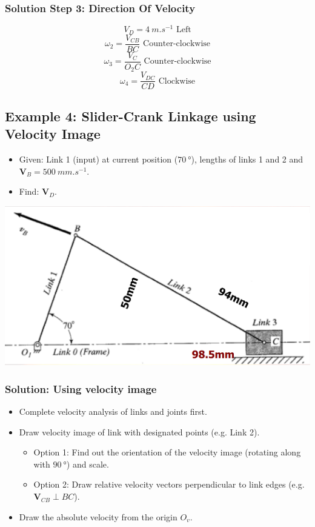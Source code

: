 \documentclass[11pt]{article}
\begin{document}
\subsubsection{Solution Step 3: Direction Of Velocity}
\label{sec:org873d2c0}
\[V_D = \qty{4}{m.s^{-1}} \text{ Left}\]
\[\omega_2 = \frac{V_{CB}}{BC} \text{ Counter-clockwise}\]
\[\omega_3 = \frac{V_{C}}{O_2 C} \text{ Counter-clockwise}\]
\[\omega_4 = \frac{V_{DC}}{CD} \text{ Clockwise}\]

 \newpage
\subsection{Example 4: Slider-Crank Linkage using Velocity Image}
\label{sec:org9549cb6}
\begin{itemize}
\item Given: Link 1 (input) at current position (\(\qty{70}{\degree}\)), lengths of links 1 and 2 and \(\boldsymbol{V}_B = \qty{500}{mm.s^{-1}}\).
\item Find: \(\boldsymbol{V}_D\).
\end{itemize}

\begin{center}
\includegraphics[width=.9\linewidth]{./images/slider-crank-linkage-graphical-analysis-example.png}
\end{center}
\subsubsection{Solution: Using velocity image}
\label{sec:org914c83a}
\begin{itemize}
\item Complete velocity analysis of links and joints first.
\item Draw velocity image of link with designated points (e.g. Link 2).
\begin{itemize}
\item Option 1: Find out the orientation of the velocity image (rotating along with \(\qty{90}{\degree}\)) and scale.
\item Option 2: Draw relative velocity vectors perpendicular to link edges (e.g. \(\boldsymbol{V}_{CB} \perp BC\)).
\end{itemize}
\item Draw the absolute velocity from the origin \(O_v\).
\end{itemize}
\end{document}
